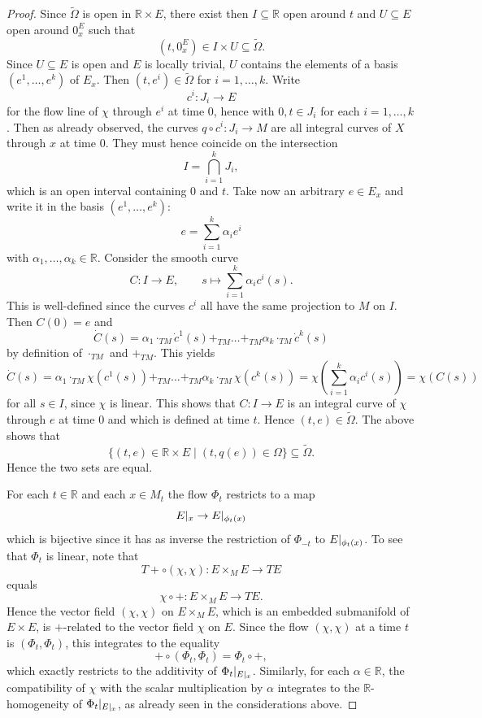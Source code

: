 \documentclass[10pt,a4paper]{amsart}
\newcommand{\R}{\mathbb{R}}
\newcommand{\an}[1]{\arrowvert_{#1}}
\begin{document}
\begin{proof}
Since $\widetilde \Omega$ is open in $\mathbb R\times E$, there exist then $I\subseteq \mathbb R$ open around $t$ and $U\subseteq E$ open around $0^E_x$ such that 
\[ (t, 0^E_x)\in I\times U\subseteq \widetilde \Omega.
\]
Since $U\subseteq E$ is open and $E$ is locally trivial, $U$ contains the elements of a basis $(e^1, \ldots, e^k)$ of $E_x$.
Then $(t,e^i)\in \widetilde \Omega$ for $i=1,\ldots, k$. Write 
\[ c^i\colon J_i\to E
\]
for the flow line of $\chi$ through $e^i$ at time $0$, hence with $0, t\in J_i$ for each $i=1,\ldots, k$. Then as already observed, the curves $q\circ c^i\colon J_i\to M$ are all integral curves of $X$ through $x$ at time $0$. They must hence coincide on the intersection
\[ I=\bigcap_{i=1}^k J_i,
\]
which is an open interval containing $0$ and $t$.
Take now an arbitrary $e\in E_x$ and write it in the basis $(e^1, \ldots, e^k)$:
\[ e=\sum_{i=1}^k \alpha_ie^i
\]
with $\alpha_1,\ldots, \alpha_k\in\mathbb R$.  
Consider the smooth curve 
\[ C\colon I\to E, \qquad s\mapsto \sum_{i=1}^k\alpha_i c^i(s).
\]
This is well-defined since the curves $c^i$ all have the same projection to $M$ on $I$.
Then $C(0)=e$ and 
\[ \dot C(s)=\alpha_1\cdot_{TM}\dot c^1(s)+_{TM}\ldots+_{TM}\alpha_k\cdot_{TM} \dot c^k(s)
\]
by definition of $\cdot_{TM}$ and $+_{TM}$.
This yields 
\[ \dot C(s)=\alpha_1\cdot_{TM}\chi(c^1(s))+_{TM}\ldots+_{TM}\alpha_k\cdot_{TM} \chi(c^k(s))=\chi\left( \sum_{i=1}^k\alpha_i c^i(s)
\right)=\chi(C(s))
\]
for all $s\in I$,
since $\chi$ is linear. This shows that $C\colon I\to E$ is an integral curve of $\chi$ through $e$ at time $0$ and which is defined at time $t$. 
Hence $(t,e)\in \widetilde \Omega$. The above shows that 
\[ \{(t, e)\in \mathbb R\times E\mid (t, q(e))\in \Omega\}\subseteq \widetilde \Omega.
\]
Hence the two sets are equal.


\medskip
For each $t\in \R$ and each $x\in M_t$ the flow $\Phi_t$ restricts to a map
\[ E\an{x}\to E\an{\phi_t(x)}
\]
which is bijective since it has as inverse the restriction of $\Phi_{-t}$ to $E\an{\phi_t(x)}$.
To see that $\Phi_t$ is linear, note that 
\[ T\!\!+\circ(\chi,\chi)\colon E\times_ME\to TE
\]
equals 
\[ \chi\circ +\colon E\times_ME\to TE.
\]
Hence the vector field $(\chi, \chi)$ on $E\times_M E$, which is an embedded submanifold of $E\times E$, is $+$-related to the vector field $\chi$ on $E$. Since the flow $(\chi, \chi)$ at a time $t$ is $(\Phi_t,\Phi_t)$, this integrates to the equality
\[ +\circ (\Phi_t,\Phi_t)=\Phi_t\circ +,
\]
which exactly restricts to the additivity of $\Phi_t\an{E\an x}$. Similarly, for each $\alpha\in \R$, the compatibility of $\chi$ with the scalar multiplication by $\alpha$ integrates to the $\mathbb R$-homogeneity of $\Phi_t\an{E\an x}$, as already seen in the considerations above.
\end{proof}
\end{document}
